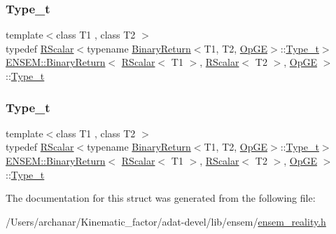 \subsubsection{\texorpdfstring{Type\_t}{Type\_t}\hspace{0.1cm}{\footnotesize\ttfamily [2/3]}}
{\footnotesize\ttfamily template$<$class T1 , class T2 $>$ \\
typedef \mbox{\hyperlink{classENSEM_1_1RScalar}{R\+Scalar}}$<$typename \mbox{\hyperlink{structENSEM_1_1BinaryReturn}{Binary\+Return}}$<$T1, T2, \mbox{\hyperlink{structENSEM_1_1OpGE}{Op\+GE}}$>$\+::\mbox{\hyperlink{structENSEM_1_1BinaryReturn_3_01RScalar_3_01T1_01_4_00_01RScalar_3_01T2_01_4_00_01OpGE_01_4_a1b28f948b115f04d8d97d69e3f4a74c7}{Type\+\_\+t}}$>$ \mbox{\hyperlink{structENSEM_1_1BinaryReturn}{E\+N\+S\+E\+M\+::\+Binary\+Return}}$<$ \mbox{\hyperlink{classENSEM_1_1RScalar}{R\+Scalar}}$<$ T1 $>$, \mbox{\hyperlink{classENSEM_1_1RScalar}{R\+Scalar}}$<$ T2 $>$, \mbox{\hyperlink{structENSEM_1_1OpGE}{Op\+GE}} $>$\+::\mbox{\hyperlink{structENSEM_1_1BinaryReturn_3_01RScalar_3_01T1_01_4_00_01RScalar_3_01T2_01_4_00_01OpGE_01_4_a1b28f948b115f04d8d97d69e3f4a74c7}{Type\+\_\+t}}}

\mbox{\label{structENSEM_1_1BinaryReturn_3_01RScalar_3_01T1_01_4_00_01RScalar_3_01T2_01_4_00_01OpGE_01_4_a1b28f948b115f04d8d97d69e3f4a74c7}} 
\subsubsection{\texorpdfstring{Type\_t}{Type\_t}\hspace{0.1cm}{\footnotesize\ttfamily [3/3]}}
{\footnotesize\ttfamily template$<$class T1 , class T2 $>$ \\
typedef \mbox{\hyperlink{classENSEM_1_1RScalar}{R\+Scalar}}$<$typename \mbox{\hyperlink{structENSEM_1_1BinaryReturn}{Binary\+Return}}$<$T1, T2, \mbox{\hyperlink{structENSEM_1_1OpGE}{Op\+GE}}$>$\+::\mbox{\hyperlink{structENSEM_1_1BinaryReturn_3_01RScalar_3_01T1_01_4_00_01RScalar_3_01T2_01_4_00_01OpGE_01_4_a1b28f948b115f04d8d97d69e3f4a74c7}{Type\+\_\+t}}$>$ \mbox{\hyperlink{structENSEM_1_1BinaryReturn}{E\+N\+S\+E\+M\+::\+Binary\+Return}}$<$ \mbox{\hyperlink{classENSEM_1_1RScalar}{R\+Scalar}}$<$ T1 $>$, \mbox{\hyperlink{classENSEM_1_1RScalar}{R\+Scalar}}$<$ T2 $>$, \mbox{\hyperlink{structENSEM_1_1OpGE}{Op\+GE}} $>$\+::\mbox{\hyperlink{structENSEM_1_1BinaryReturn_3_01RScalar_3_01T1_01_4_00_01RScalar_3_01T2_01_4_00_01OpGE_01_4_a1b28f948b115f04d8d97d69e3f4a74c7}{Type\+\_\+t}}}



The documentation for this struct was generated from the following file\+:\begin{DoxyCompactItemize}
\item 
/\+Users/archanar/\+Kinematic\+\_\+factor/adat-\/devel/lib/ensem/\mbox{\hyperlink{adat-devel_2lib_2ensem_2ensem__reality_8h}{ensem\+\_\+reality.\+h}}\end{DoxyCompactItemize}
